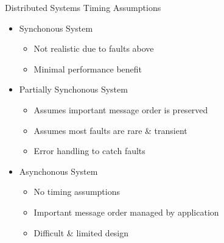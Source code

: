 \documentclass{slide}
\begin{document}
\begin{frame}{Distributed Systems Timing Assumptions}
    \vspace{1mm}
    {\LARGE
    \begin{itemize}
        \item<1-> Synchonous System
        \begin{itemize}
            \Large\item Not realistic due to faults above
            \Large\item Minimal performance benefit
        \end{itemize}
        \vspace{2mm}
        \item<2-> Partially Synchonous System
        \begin{itemize}
            \Large\item Assumes important message order is preserved
            \Large\item Assumes most faults are rare \& transient
            \Large\item Error handling to catch faults
        \end{itemize}
        \vspace{2mm}
        \item<3-> Asynchonous System
        \begin{itemize}
            \Large\item No timing assumptions
            \Large\item Important message order managed by application
            \Large\item Difficult \& limited design
        \end{itemize}
    \end{itemize}
    }
\end{frame}
\end{document}
